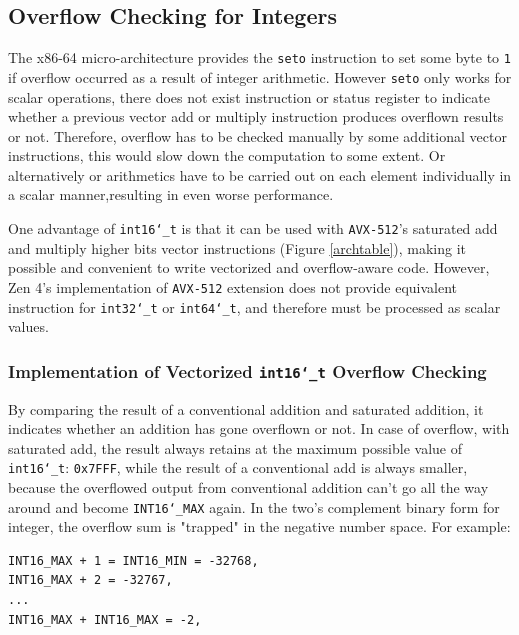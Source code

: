 \documentclass[logo,bsc,singlespacing,parskip]{infthesis}
\newcommand{\dtshort}{\texttt{int16\char`_t}}
\newcommand{\dtint}{\texttt{int32\char`_t}}
\newcommand{\dtlong}{\texttt{int64\char`_t}}
\begin{document}
\subsection{Overflow Checking for Integers}
\label{sec:overflow-int}

The x86-64 micro-architecture provides the \texttt{seto} instruction to set some
byte to \texttt{1} if overflow occurred as a result of integer arithmetic.
However \texttt{seto} only works for scalar operations, there does not exist
instruction or status register to indicate whether a previous vector add or
multiply instruction produces overflown results or not. Therefore, overflow has
to be checked manually by some additional vector instructions, this would slow
down the computation to some extent. Or alternatively or arithmetics have to be
carried out on each element individually in a scalar manner,resulting in even
worse performance. 



One advantage of \dtshort{} is that it can be used with \texttt{AVX-512}'s
saturated add and multiply higher bits vector instructions (Figure 
\ref{archtable}), making it possible and convenient to write vectorized and
overflow-aware code. However, Zen 4's implementation of \texttt{AVX-512} extension does
not provide equivalent instruction for \dtint{} or \dtlong{},
and therefore must be processed as scalar values.


\subsubsection{Implementation of Vectorized \dtshort{} Overflow Checking}
\label{sec:i16-overflow-checking}
By comparing the result of a conventional addition and saturated addition, it
indicates whether an addition has gone overflown or not. In case of overflow,
with saturated add, the result always retains at the maximum possible value of
\dtshort{}: \texttt{0x7FFF}, while the result of a conventional add is
always smaller, because the overflowed output from conventional addition can't
go all the way around and become \texttt{INT16\char`_MAX} again. In the two's
complement binary form for integer, the overflow sum is "trapped" in the
negative number space. For example: 
\begin{verbatim}
INT16_MAX + 1 = INT16_MIN = -32768, 
INT16_MAX + 2 = -32767, 
...
INT16_MAX + INT16_MAX = -2, 
\end{verbatim}
\end{document}
